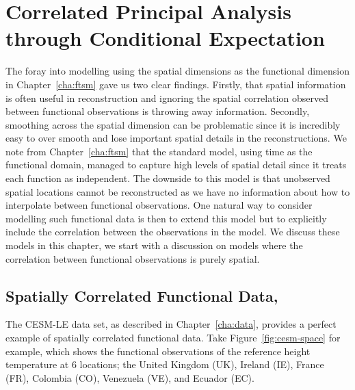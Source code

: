 
\chapter{Correlated Principal Analysis through Conditional Expectation \label{cha:cpace}}  %

\ifpdf
    \graphicspath{{Chapter5/Figs/Raster/}{Chapter5/Figs/PDF/}{Chapter5/Figs/}}
\else
    \graphicspath{{Chapter5/Figs/Vector/}{Chapter5/Figs/}}
\fi

The foray into modelling using the spatial dimensions as the functional dimension in Chapter~\ref{cha:ftsm} gave us two clear findings.
Firstly, that spatial information is often useful in reconstruction and ignoring the spatial correlation observed between functional observations is throwing away information.
Secondly, smoothing across the spatial dimension can be problematic since it is incredibly easy to over smooth and lose important spatial details in the reconstructions. 
We note from Chapter~\ref{cha:ftsm} that the standard model, using time as the functional domain, managed to capture high levels of spatial detail since it treats each function as independent.
The downside to this model is that unobserved spatial locations cannot be reconstructed as we have no information about how to interpolate between functional observations.
One natural way to consider modelling such functional data is then to extend this model but to explicitly include the correlation between the observations in the model. 
We discuss these models in this chapter, we start with a discussion on models where the correlation between functional observations is purely spatial.

\section{Spatially Correlated Functional Data, \label{sec:space}}
The CESM-LE data set, as described in Chapter~\ref{cha:data}, provides a perfect example of spatially correlated functional data.
Take Figure~\ref{fig:cesm-space} for example, which shows the functional observations of the reference height temperature at 6 locations; the United Kingdom (UK), Ireland (IE), France (FR), Colombia (CO), Venezuela (VE), and Ecuador (EC). 

